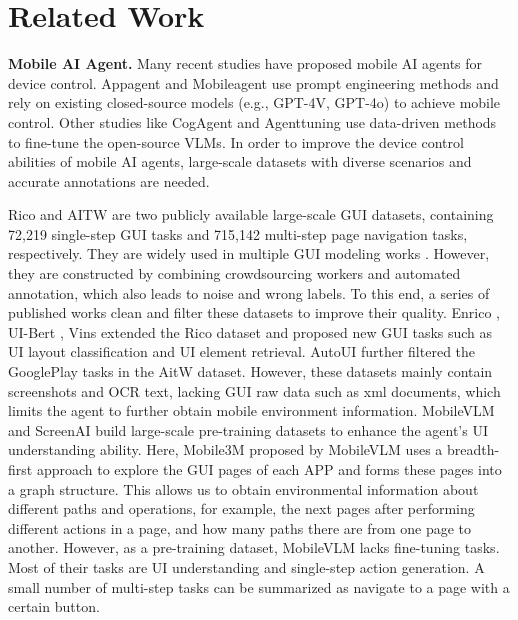 \section{Related Work}
\textbf{Mobile AI Agent.}
Many recent studies have proposed mobile AI agents for device control. Appagent \cite{yang2023appagent} and Mobileagent \cite{ding2024mobileagent}  use prompt engineering methods and rely on existing closed-source models (e.g., GPT-4V, GPT-4o) to achieve mobile control. Other studies like CogAgent \cite{hong2023cogagent} and Agenttuning \cite{zeng2023agenttuning} use data-driven methods to fine-tune the open-source VLMs.
In order to improve the device control abilities of mobile AI agents, large-scale datasets with diverse scenarios and accurate annotations are needed.

Rico \cite{deka2017rico} and AITW \cite{rawles2023android}  are two publicly available large-scale GUI datasets, containing 72,219 single-step GUI tasks and 715,142 multi-step page navigation tasks, respectively. They are widely used in multiple GUI modeling works \cite{wang2021screen2words,li2021screen2vec,hsiao2022screenqa}.
However, they are constructed by combining crowdsourcing workers and automated annotation, which also leads to noise and wrong labels. 
To this end, a series of published works clean and filter these datasets to improve their quality.
Enrico \cite{leiva2020enrico}, UI-Bert \cite{bai2021uibert}, Vins \cite{bunian2021vins} extended the Rico dataset and proposed new GUI tasks such as UI layout classification and UI element retrieval. AutoUI \cite{zhan2023you} further filtered the GooglePlay tasks in the AitW dataset. However, these datasets mainly contain screenshots and OCR text, lacking GUI raw data such as xml documents, which limits the agent to further obtain mobile environment information. 
MobileVLM \cite{wu2024mobilevlm} and ScreenAI \cite{baechler2024screenai} build large-scale pre-training datasets to enhance the agent’s UI understanding ability. Here, Mobile3M \cite{wu2024mobilevlm} proposed by MobileVLM uses a breadth-first approach to explore the GUI pages of each APP and forms these pages into a graph structure. This allows us to obtain environmental information about different paths and operations, for example, the next pages after performing different actions in a page, and how many paths there are from one page to another.
However, as a pre-training dataset, MobileVLM lacks fine-tuning tasks. Most of their tasks are UI understanding and single-step action generation. A small number of multi-step tasks can be summarized as navigate to a page with a certain button.

